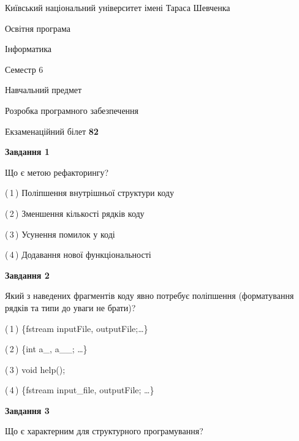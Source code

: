 \documentclass[10pt, ukrainian]{article}
\begin{document}
{{\begin {small}\par
{ \center  Київський національний університет імені Тараса Шевченка \par}
{\parbox {5 cm}{Освітня програма \hfill}{\parbox {7 cm}{Інформатика \hfill}}\parbox {6 cm}{\hfill Семестр 6}}\par
{\parbox {5 cm} {Навчальний предмет \hfill}\parbox {7 cm}{Розробка програмного забезпечення \hfill}\parbox {6cm}{\hfill}\par}\vspace{-7pt} \end{small}}{\center Екзаменаційний білет \No \textbf
{ 82 }\par}}
{
\begin {large}
{\begin {center}\textbf{Завдання 1}\end {center}}\par
Що є метою рефакторингу?\par
\vspace{2mm}



(\,1\,) Поліпшення внутрішньої структури коду%



(\,2\,) Зменшення кількості рядків коду%



(\,3\,) Усунення помилок у коді%



(\,4\,) Додавання нової функціональності%


{\begin {center}\textbf{Завдання 2}\end {center}}\par
Який з наведених фрагментів коду явно потребує поліпшення (форматування рядків та типи до уваги не брати)?\par
\vspace{2mm}



(\,1\,) \{fstream inputFile, outputFile;…\} %



(\,2\,) \{int a\_, a\_\_; …\}%



(\,3\,) void help();%



(\,4\,) \{fstream input\_file, outputFile; …\}%


{\begin {center}\textbf{Завдання 3}\end {center}}\par
Що є характерним для структурного програмування?\par
\vspace{2mm}




\end{large}}
\end{document}

